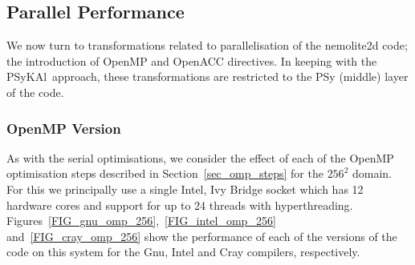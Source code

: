\documentclass[journal]{IEEEtran}
\newcommand{\psykal}{{PS}y{KA}l\ }
\begin{document}
%
%



\subsection{Parallel Performance}

We now turn to transformations related to parallelisation of the
nemolite2d code; the introduction of OpenMP and OpenACC directives. In
keeping with the \psykal approach, these transformations are
restricted to the PSy (middle) layer of the code.

\subsubsection{OpenMP Version}

As with the serial optimisations, we consider the effect of each of
the OpenMP optimisation steps described in Section~\ref{sec_omp_steps}
for the $256^2$ domain. For this we principally use a single Intel,
Ivy Bridge socket which has 12 hardware cores and support for up to 24
threads with hyperthreading.
Figures~\ref{FIG_gnu_omp_256},~\ref{FIG_intel_omp_256}
and~\ref{FIG_cray_omp_256} show the performance of each of the
versions of the code on this system for the Gnu, Intel and Cray
compilers, respectively.
\end{document}
